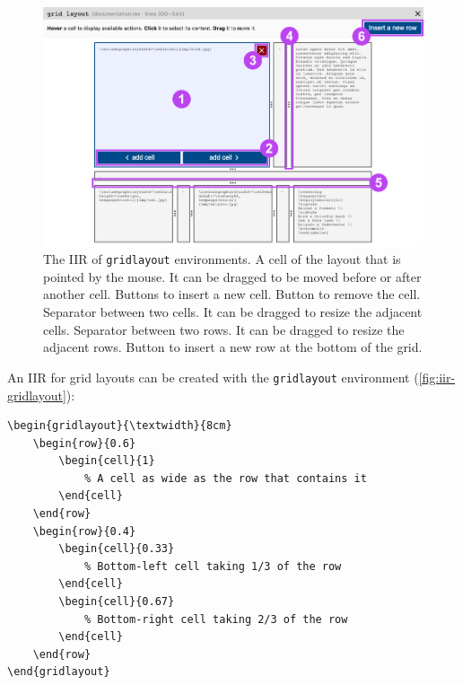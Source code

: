 \begin{figure}[h!]
    \centering
    \includegraphics[width = .95\textwidth]{img/iir-gridlayout.png}
    \caption{The IIR of \texttt{gridlayout} environments.  A cell of the layout that is pointed by the mouse. It can be dragged to be moved before or after another cell.  Buttons to insert a new cell.  Button to remove the cell.  Separator between two cells. It can be dragged to resize the adjacent cells.  Separator between two rows. It can be dragged to resize the adjacent rows.  Button to insert a new row at the bottom of the grid.}
    \label{fig:iir-gridlayout}
\end{figure}

An IIR for grid layouts can be created with the \texttt{gridlayout} environment (\autoref{fig:iir-gridlayout}):

\begin{lstlisting}[style=custom-latex]
% This grid is as wide as the text (\textwidth) and 8cm tall
\begin{gridlayout}{\textwidth}{8cm}
    \begin{row}{0.6}
        \begin{cell}{1}
            % A cell as wide as the row that contains it
        \end{cell}
    \end{row}
    \begin{row}{0.4}
        \begin{cell}{0.33}
            % Bottom-left cell taking 1/3 of the row
        \end{cell}
        \begin{cell}{0.67}
            % Bottom-right cell taking 2/3 of the row
        \end{cell}
    \end{row}
\end{gridlayout}
\end{lstlisting}


